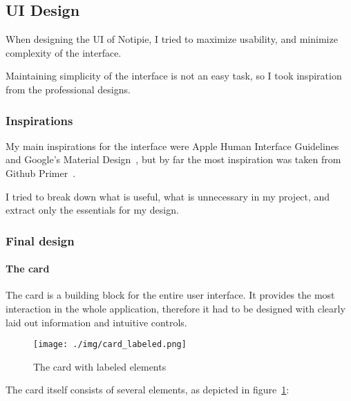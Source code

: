 \subsection{UI Design}\label{sec:ui-design}

When designing the UI of Notipie,
I tried to maximize usability,
and minimize complexity of the interface.

Maintaining simplicity of the interface is not an easy task,
so I took inspiration from the professional designs.

\subsubsection{Inspirations}\label{sec:inspirations}

My main inspirations for the interface were
Apple Human Interface Guidelines~\cite{apple_inc_human_2022}
and Google's Material Design~\cite{google_llc_material_2022},
but by far the most inspiration was taken from
Github Primer~\cite{github_inc_primer_2022}.

I tried to break down what is useful,
what is unnecessary in my project,
and extract only the essentials for my design.

\subsubsection{Final design}\label{sec:final-design}

\paragraph*{The card}\label{the-card}

The card is a building block for the entire user interface.
It provides the most interaction in the whole application,
therefore it had to be designed with clearly laid out information
and intuitive controls.

\begin{figure}[h]
      \centering
      \texttt{[image: ./img/card\_labeled.png]}
      \caption{The card with labeled elements}
      \label{fig:card-with-labeled-elements}
\end{figure}

The card itself consists of several elements,
as depicted in figure~\ref{fig:card-with-labeled-elements}:

